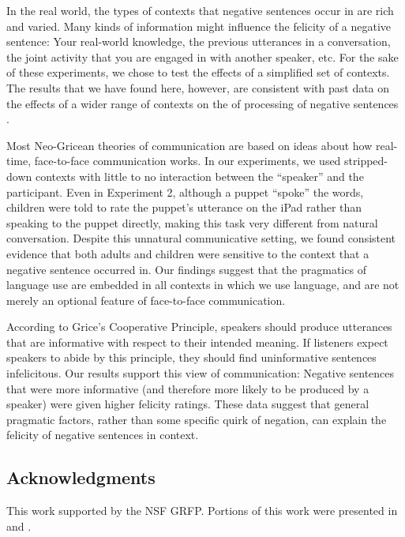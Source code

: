 \documentclass[man, noapacite]{apa2}
\begin{document}
In the real world, the types of contexts that negative sentences occur in are rich and varied. Many kinds of information might influence the felicity of a negative sentence: Your real-world knowledge, the previous utterances in a conversation, the joint activity that you are engaged in with another speaker, etc. For the sake of these experiments, we chose to test the effects of a simplified set of contexts. The results that we have found here, however, are consistent with past data on the effects of a wider range of contexts on the of processing of negative sentences \cite{clark1976, wason1965, glenberg1999, nieuwland2008, dale2011, nordmeyer2014}.

Most Neo-Gricean theories of communication are based on ideas about how real-time, face-to-face communication works. In our experiments, we used stripped-down contexts with little to no interaction between the ``speaker'' and the participant. Even in Experiment 2, although a puppet ``spoke'' the words, children were told to rate the puppet's utterance on the iPad rather than speaking to the puppet directly, making this task very different from natural conversation. Despite this unnatural communicative setting, we found consistent evidence that both adults and children were sensitive to the context that a negative sentence occurred in. Our findings suggest that the pragmatics of language use are embedded in all contexts in which we use language, and are not merely an optional feature of face-to-face communication.

According to Grice's Cooperative Principle, speakers should produce utterances that are informative with respect to their intended meaning. If listeners expect speakers to abide by this principle, they should find uninformative sentences infelicitous. Our results support this view of communication: Negative sentences that were more informative (and therefore more likely to be produced by a speaker) were given higher felicity ratings. These data suggest that general pragmatic factors, rather than some specific quirk of negation, can explain the felicity of negative sentences in context.

\subsection{Acknowledgments}
This work supported by the NSF GRFP. Portions of this work were presented in  and .


\end{document}
